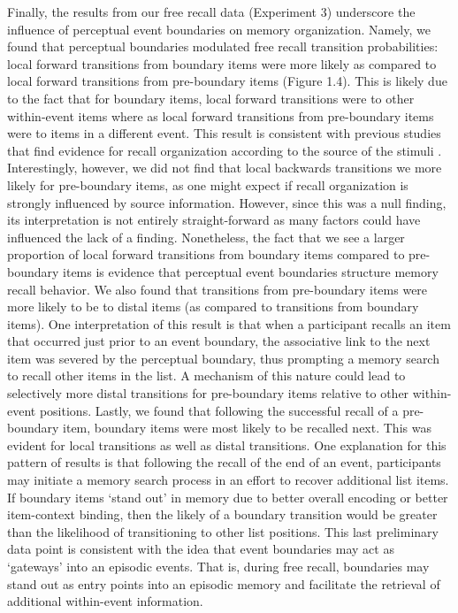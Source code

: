 Finally, the results from our free recall data (Experiment 3) underscore
the influence of perceptual event boundaries on memory organization.
Namely, we found that perceptual boundaries modulated free recall
transition probabilities: local forward transitions from boundary items
were more likely as compared to local forward transitions from
pre-boundary items (Figure 1.4). This is likely due to the fact that for
boundary items, local forward transitions were to other within-event
items where as local forward transitions from pre-boundary items were to
items in a different event. This result is consistent with previous
studies that find evidence for recall organization according to the
source of the stimuli
\autocites{frost_clustering_1971}{hintzman_memory_1972}{murdock_modality_1969}{nilsson_further_1974}{polyn_task_2009}.
Interestingly, however, we did not find that local backwards transitions
we more likely for pre-boundary items, as one might expect if recall
organization is strongly influenced by source information. However,
since this was a null finding, its interpretation is not entirely
straight-forward as many factors could have influenced the lack of a
finding. Nonetheless, the fact that we see a larger proportion of local
forward transitions from boundary items compared to pre-boundary items
is evidence that perceptual event boundaries structure memory recall
behavior. We also found that transitions from pre-boundary items were
more likely to be to distal items (as compared to transitions from
boundary items). One interpretation of this result is that when a
participant recalls an item that occurred just prior to an event
boundary, the associative link to the next item was severed by the
perceptual boundary, thus prompting a memory search to recall other
items in the list. A mechanism of this nature could lead to selectively
more distal transitions for pre-boundary items relative to other
within-event positions. Lastly, we found that following the successful
recall of a pre-boundary item, boundary items were most likely to be
recalled next. This was evident for local transitions as well as distal
transitions. One explanation for this pattern of results is that
following the recall of the end of an event, participants may initiate a
memory search process in an effort to recover additional list items. If
boundary items `stand out' in memory due to better overall encoding or
better item-context binding, then the likely of a boundary transition
would be greater than the likelihood of transitioning to other list
positions. This last preliminary data point is consistent with the idea
that event boundaries may act as `gateways' into an episodic events.
That is, during free recall, boundaries may stand out as entry points
into an episodic memory and facilitate the retrieval of additional
within-event information.

